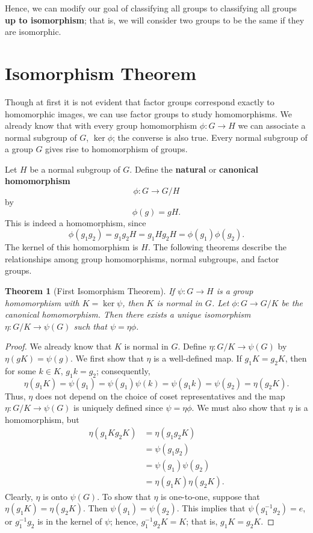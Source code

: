 \documentclass[12pt]{article}
\newtheorem{thm}{Theorem}[section]
\theoremstyle{plain}
\begin{document}
Hence, we can modify our goal of classifying all groups to classifying all groups \textbf{up to isomorphism}; that is, we will consider two groups to be the same if they are isomorphic.
\section{Isomorphism Theorem}

Though at first it is not evident that factor groups correspond
exactly to homomorphic images, we can use factor groups to study
homomorphisms. We already know that with every group homomorphism
$\phi: G \rightarrow H$ we can associate a normal subgroup of $G$,
$\ker \phi$; the converse is also true. Every normal subgroup of a
group $G$ gives rise to homomorphism of groups.

Let $H$ be a normal subgroup of $G$. Define the \textbf{natural} or \textbf{canonical homomorphism}
\[
\phi : G \rightarrow G/H
\]
by
\[
\phi(g) = gH.
\]
This is indeed a homomorphism, since
\[
\phi( g_1 g_2 ) = g_1 g_2 H =  g_1 H g_2 H = \phi( g_1) \phi( g_2 ).
\]
The kernel of this homomorphism is $H$.	 The following theorems
describe the relationships among group homomorphisms, normal
subgroups, and factor groups.


\begin{thm}[First Isomorphism Theorem]\label{FirstIsoTheorem}
If $\psi : G \rightarrow H$ is a group homomorphism with $K =\ker
\psi$, then $K$ is normal in $G$. Let $\phi: G \rightarrow G/K$ be
the canonical homomorphism.  Then there exists a unique isomorphism
$\eta: G/K \rightarrow \psi(G)$ such that $\psi =  \eta \phi$.
\end{thm}


\begin{proof}
We already know that $K$ is normal in $G$. Define $\eta: G/K
\rightarrow \psi(G)$ by $\eta(gK) = \psi(g)$.  We first show that
$\eta$ is a well-defined map.  If $g_1 K =g_2 K$, then for some $k \in
K$, $g_1 k=g_2$; consequently,
\[
\eta(g_1 K) = \psi(g_1) = \psi(g_1) \psi(k) = \psi(g_1k) = \psi(g_2)
= \eta(g_2 K).
\]
Thus, $\eta$ does not depend on the choice of coset representatives and the map $\eta: G/K \rightarrow \psi(G)$  is uniquely defined since $\psi =  \eta \phi$.
We must also
show that $\eta$ is a homomorphism, but
\begin{align*}
\eta( g_1K g_2K ) & = \eta(g_1 g_2K) \\
& = \psi(g_1 g_2) \\
& = \psi(g_1) \psi(g_2) \\
& = \eta( g_1K) \eta( g_2K ).
\end{align*}
Clearly, $\eta$ is onto $\psi( G)$.
To show that $\eta$ is one-to-one, suppose that $\eta(g_1 K) =
\eta(g_2 K)$. Then $\psi(g_1) = \psi(g_2)$. This implies that
$\psi( g_1^{-1} g_2 ) = e$, or $g_1^{-1} g_2$ is in the kernel of $\psi$;
hence, $g_1^{-1} g_2K = K$; that is, $g_1K =g_2K$.
\end{proof}
\end{document}
